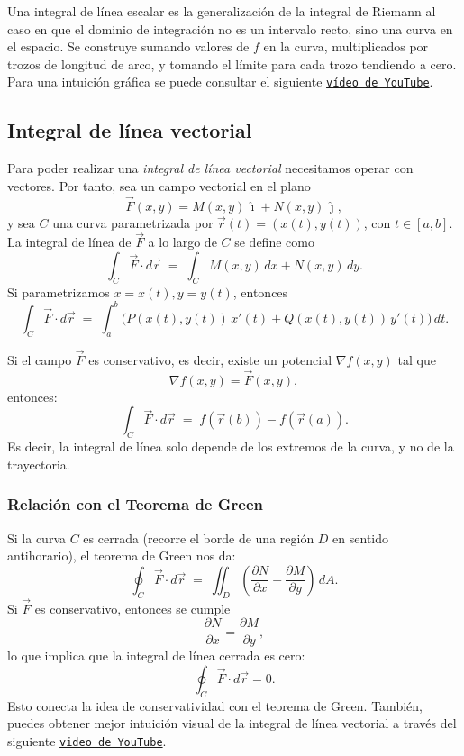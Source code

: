 Una integral de línea escalar es la generalización de la integral de Riemann al caso en que el dominio de integración no es un intervalo recto, sino una curva en el espacio. Se construye sumando valores de $f$ en la curva, multiplicados por trozos de longitud de arco, y tomando el límite para cada trozo tendiendo a cero. Para una intuición gráfica se puede consultar el siguiente \href{https://www.youtube.com/watch?v=wCphv9dCswg}{\texttt{vídeo de YouTube}}.

\subsection{Integral de línea vectorial}

Para poder realizar una \textit{integral de línea vectorial} necesitamos operar con vectores. Por tanto, sea un campo vectorial en el plano
$$
\vec{F}(x,y) = M(x,y)\,\hat{\imath} + N(x,y)\,\hat{\jmath},
$$
y sea $C$ una curva parametrizada por $\vec{r}(t) = (x(t),y(t))$, con $t \in [a,b]$. La integral de línea de $\vec{F}$ a lo largo de $C$ se define como
$$
\int_C \vec{F}\cdot d\vec{r} \;=\; \int_C M(x,y)\,dx + N(x,y)\,dy.
$$
Si parametrizamos $x=x(t), y=y(t)$, entonces
$$
\int_C \vec{F}\cdot d\vec{r} \;=\; \int_a^b \Big( P(x(t),y(t))\,x'(t) + Q(x(t),y(t))\,y'(t) \Big)\,dt.
$$

Si el campo $\vec{F}$ es conservativo, es decir, existe un potencial $\nabla f(x,y)$ tal que
$$
\nabla f(x,y) = \vec{F}(x,y),
$$
entonces:
$$
\int_C \vec{F}\cdot d\vec{r} \;=\; f(\vec{r}(b)) - f(\vec{r}(a)).
$$
Es decir, la integral de línea solo depende de los extremos de la curva, y no de la trayectoria.

\subsubsection{Relación con el Teorema de Green}

Si la curva $C$ es cerrada (recorre el borde de una región $D$ en sentido antihorario), el teorema de Green nos da:
$$
\oint_C \vec{F}\cdot d\vec{r} \;=\; \iint_D \left( \frac{\partial N}{\partial x} - \frac{\partial M}{\partial y} \right)\, dA.
$$
Si $\vec{F}$ es conservativo, entonces se cumple
$$
\frac{\partial N}{\partial x} = \frac{\partial M}{\partial y},
$$
lo que implica que la integral de línea cerrada es cero:
$$
\oint_C \vec{F}\cdot d\vec{r} = 0.
$$
Esto conecta la idea de conservatividad con el teorema de Green. También, puedes obtener mejor intuición visual de la integral de línea vectorial a través del siguiente \href{https://youtu.be/eNUwFNg2yEQ?si=v1UCN24Bqt7mTakh}{\texttt{video de YouTube}}.
